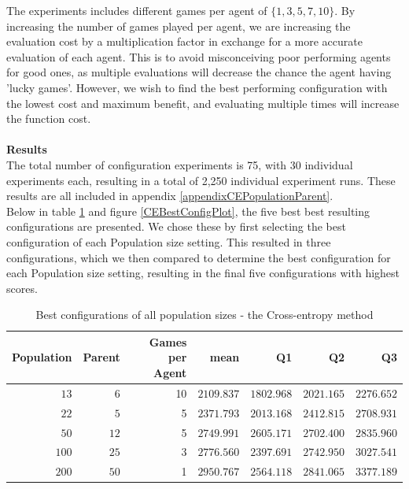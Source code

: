 The experiments includes different games per agent of $\{1,3,5,7,10\}$. By increasing the number of games 
played per agent, we are increasing the evaluation cost by a multiplication factor in exchange for a more 
accurate evaluation of each agent. This is to avoid misconceiving poor performing agents
for good ones, as multiple evaluations will decrease the chance the agent having 
'lucky games'. However, we wish to find 
the best performing configuration with the lowest cost and maximum benefit, and evaluating multiple 
times will increase the function cost.\\
\\
\textbf{Results}\\
The total number of configuration experiments is 75, with 30 individual experiments each,
resulting in a total of
2,250
individual experiment runs. These results are all included in 
appendix \ref{appendixCEPopulationParent}.\\
Below in table \ref{CEBestConfigTable} and figure \ref{CEBestConfigPlot}, the five best
best resulting configurations are presented. We chose these by first selecting the best 
configuration of each Population size setting. This resulted in three
configurations, which we then compared to determine the best
configuration for each Population size setting, resulting in the final five configurations with
highest scores.
\begin{table}[H]
\centering
\small
\begin{tabular}{r r r r r r r}
Population & Parent & Games per Agent & mean & Q1 & Q2 & Q3\\
\hline
$13$ & $6$ & 10 & $2109.837$ & $1802.968$ & $2021.165$ & $2276.652$\\
$22$ & $5$ & 5 & $2371.793$ & $2013.168$ & $2412.815$ & $2708.931$\\
$50$ & $12$ & 5 & $2749.991$ & $2605.171$ & $2702.400$ & $2835.960$\\
$100$ & $25$ & 3 & $2776.560$ & $2397.691$ & $2742.950$ & $3027.541$\\
$200$ & $50$ & 1 & $2950.767$ & $2564.118$ & $2841.065$ & $3377.189$\\
\end{tabular}
\caption{Best configurations of all population sizes - the Cross-entropy method \label{CEBestConfigTable}}
\end{table}

